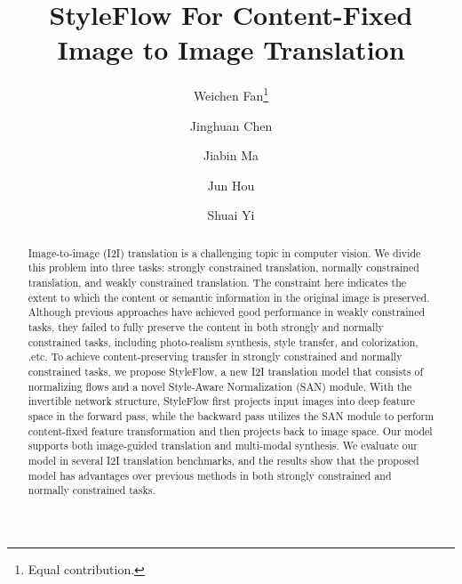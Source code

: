 \documentclass[runningheads]{llncs}
\begin{document}
\pagestyle{headings}
\mainmatter
\def\ECCVSubNumber{4368}  

\title{StyleFlow For Content-Fixed Image to Image Translation} 

\begin{comment}
\titlerunning{ECCV-22 submission ID \ECCVSubNumber} 
\authorrunning{ECCV-22 submission ID \ECCVSubNumber} 
\author{Anonymous ECCV submission}
\institute{Paper ID \ECCVSubNumber}
\end{comment}


\author{Weichen Fan\thanks{Equal contribution.} \and
Jinghuan Chen \and Jiabin Ma \and Jun Hou \and Shuai Yi}


\maketitle

\begin{abstract}
Image-to-image (I2I) translation is a challenging topic in computer vision. We divide this problem into three tasks: strongly constrained translation, normally constrained translation, and weakly constrained translation. The constraint here indicates the extent to which the content or semantic information in the original image is preserved. Although previous approaches have achieved good performance in weakly constrained tasks, they failed to fully preserve the content in both strongly and normally constrained tasks, including photo-realism synthesis, style transfer, and colorization, .etc. To achieve content-preserving transfer in strongly constrained and normally constrained tasks, we propose StyleFlow, a new I2I translation model that consists of normalizing flows and a novel Style-Aware Normalization (SAN) module. With the invertible network structure, StyleFlow first projects input images into deep feature space in the forward pass, while the backward pass utilizes the SAN module to perform content-fixed feature transformation and then projects back to image space. Our model supports both image-guided translation and multi-modal synthesis. We evaluate our model in several I2I translation benchmarks, and the results show that the proposed model has advantages over previous methods in both strongly constrained and normally constrained tasks.
\end{abstract}
\end{document}
